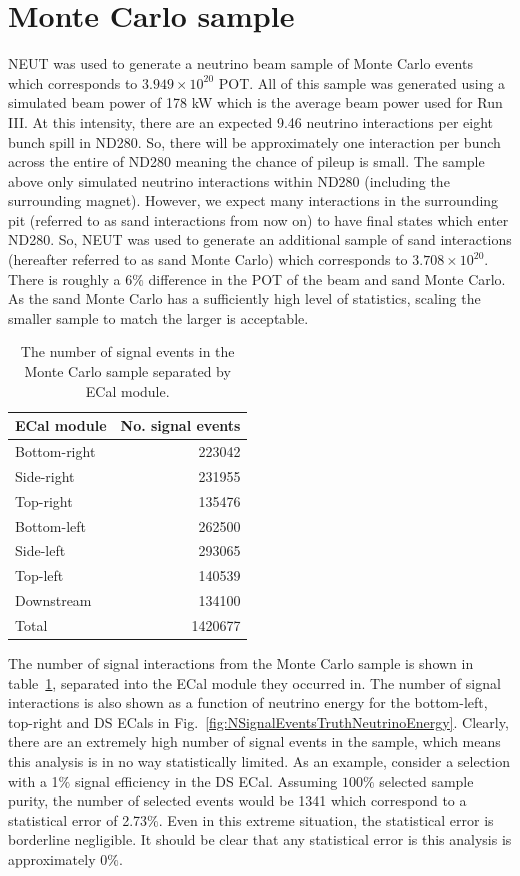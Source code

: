 \section{Monte Carlo sample}
\label{sec:MonteCarloSample}
NEUT was used to generate a neutrino beam sample of Monte Carlo events which corresponds to $3.949\times10^{20}$ POT.  All of this sample was generated using a simulated beam power of 178 kW which is the average beam power used for Run III.  At this intensity, there are an expected 9.46 neutrino interactions per eight bunch spill in ND280.  So, there will be approximately one interaction per bunch across the entire of ND280 meaning the chance of pileup is small. 
\newline
\newline
The sample above only simulated neutrino interactions within ND280 (including the surrounding magnet).  However, we expect many interactions in the surrounding pit (referred to as sand interactions from now on) to have final states which enter ND280.  So, NEUT was used to generate an additional sample of sand interactions (hereafter referred to as sand Monte Carlo) which corresponds to $3.708\times10^{20}$.  There is roughly a 6$\%$ difference in the POT of the beam and sand Monte Carlo.  As the sand Monte Carlo has a sufficiently high level of statistics, scaling the smaller sample to match the larger is acceptable.
\newline
\newline
\begin{table}
  \begin{tabular}{ l r }
    ECal module & No. signal events \\ \hline \hline
    Bottom-right & 223042 \\
    Side-right & 231955 \\
    Top-right & 135476 \\
    Bottom-left & 262500 \\
    Side-left & 293065 \\
    Top-left & 140539 \\
    Downstream & 134100 \\
    \hline
    Total & 1420677 \\
  \end{tabular}
  \caption{The number of signal events in the Monte Carlo sample separated by ECal module.}
  \label{table:NSignalEventsTruth}
\end{table}
The number of signal interactions from the Monte Carlo sample is shown in table~\ref{table:NSignalEventsTruth}, separated into the ECal module they occurred in.  The number of signal interactions is also shown as a function of neutrino energy for the bottom-left, top-right and DS ECals in Fig.~\ref{fig:NSignalEventsTruthNeutrinoEnergy}.  Clearly, there are an extremely high number of signal events in the sample, which means this analysis is in no way statistically limited.  As an example, consider a selection with a 1$\%$ signal efficiency in the DS ECal.  Assuming $100\%$ selected sample purity, the number of selected events would be 1341 which correspond to a statistical error of 2.73$\%$.  Even in this extreme situation, the statistical error is borderline negligible.  It should be clear that any statistical error is this analysis is approximately $0\%$.
